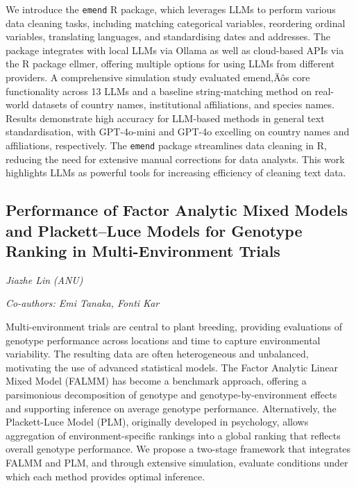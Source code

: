 \documentclass[
]{scrreprt}
\begin{document}
We introduce the \texttt{emend} R package, which leverages LLMs to
perform various data cleaning tasks, including matching categorical
variables, reordering ordinal variables, translating languages, and
standardising dates and addresses. The package integrates with local
LLMs via Ollama as well as cloud-based APIs via the R package ellmer,
offering multiple options for using LLMs from different providers. A
comprehensive simulation study evaluated emend‚Äôs core functionality
across 13 LLMs and a baseline string-matching method on real-world
datasets of country names, institutional affiliations, and species
names. Results demonstrate high accuracy for LLM-based methods in
general text standardisation, with GPT-4o-mini and GPT-4o excelling on
country names and affiliations, respectively. The \texttt{emend} package
streamlines data cleaning in R, reducing the need for extensive manual
corrections for data analysts. This work highlights LLMs as powerful
tools for increasing efficiency of cleaning text data.

\subsection{Performance of Factor Analytic Mixed Models and
Plackett--Luce Models for Genotype Ranking in Multi-Environment
Trials}\label{performance-of-factor-analytic-mixed-models-and-plackettluce-models-for-genotype-ranking-in-multi-environment-trials}

\emph{Jiazhe Lin} \emph{(ANU)}

\emph{Co-authors: Emi Tanaka, Fonti Kar}

\setlength{\parskip}{0.5em}

Multi-environment trials are central to plant breeding, providing
evaluations of genotype performance across locations and time to capture
environmental variability. The resulting data are often heterogeneous
and unbalanced, motivating the use of advanced statistical models. The
Factor Analytic Linear Mixed Model (FALMM) has become a benchmark
approach, offering a parsimonious decomposition of genotype and
genotype-by-environment effects and supporting inference on average
genotype performance. Alternatively, the Plackett-Luce Model (PLM),
originally developed in psychology, allows aggregation of
environment-specific rankings into a global ranking that reflects
overall genotype performance. We propose a two-stage framework that
integrates FALMM and PLM, and through extensive simulation, evaluate
conditions under which each method provides optimal inference.
\end{document}
